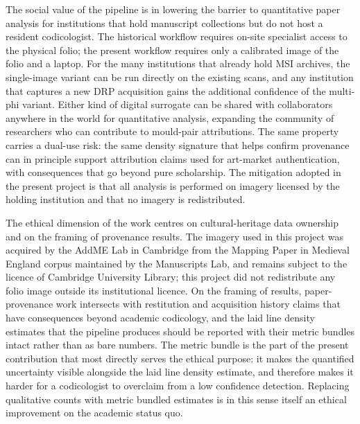 The social value of the pipeline is in lowering the barrier to
quantitative paper analysis for institutions that hold manuscript
collections but do not host a resident codicologist. The
historical workflow requires on-site specialist access to the
physical folio; the present workflow requires only a calibrated
image of the folio and a laptop. For the many institutions that
already hold MSI archives, the single-image variant can be run
directly on the existing scans, and any institution that captures
a new DRP acquisition gains the additional confidence of the
multi-phi variant. Either kind of digital surrogate can be
shared with collaborators anywhere in the world for quantitative
analysis, expanding the community of researchers who can
contribute to mould-pair attributions. The same property carries a dual-use risk: the same
density signature that helps confirm provenance can in principle
support attribution claims used for art-market authentication, with
consequences that go beyond pure scholarship. The mitigation
adopted in the present project is that all analysis is performed
on imagery licensed by the holding institution and that no
imagery is redistributed.
\fi

The ethical dimension of the work centres on cultural-heritage
data ownership and on the framing of provenance results. The
imagery used in this project was acquired by the AddME Lab in
Cambridge from the Mapping Paper in Medieval England corpus
maintained by the Manuscripts Lab, and remains subject to the
licence of Cambridge University Library; this project did not
redistribute any folio image outside its institutional licence.
On the framing of results, paper-provenance work intersects with
restitution and acquisition history claims that have
consequences beyond academic codicology, and the laid line density
estimates that the pipeline produces should be reported with their
metric bundles intact rather than as bare numbers. The metric
bundle is the part of the present contribution that most directly
serves the ethical purpose: it makes the quantified uncertainty
visible alongside the laid line density estimate, and therefore makes it
harder for a codicologist to overclaim from a low confidence
detection. Replacing qualitative counts with metric bundled
estimates is in this sense itself an ethical improvement on the academic
status quo.
